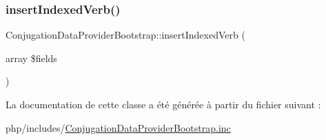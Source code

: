 \hypertarget{class_conjugation_data_provider_bootstrap_a862ea39b6d38e79b84cfeaccba0fbd52}{}\label{class_conjugation_data_provider_bootstrap_a862ea39b6d38e79b84cfeaccba0fbd52} 
\subsubsection{\texorpdfstring{insert\+Indexed\+Verb()}{insertIndexedVerb()}}
{\footnotesize\ttfamily Conjugation\+Data\+Provider\+Bootstrap\+::insert\+Indexed\+Verb (\begin{DoxyParamCaption}\item[{array}]{\$fields }\end{DoxyParamCaption})}



La documentation de cette classe a été générée à partir du fichier suivant \+:\begin{DoxyCompactItemize}
\item 
php/includes/\hyperlink{_conjugation_data_provider_bootstrap_8inc}{Conjugation\+Data\+Provider\+Bootstrap.\+inc}\end{DoxyCompactItemize}
